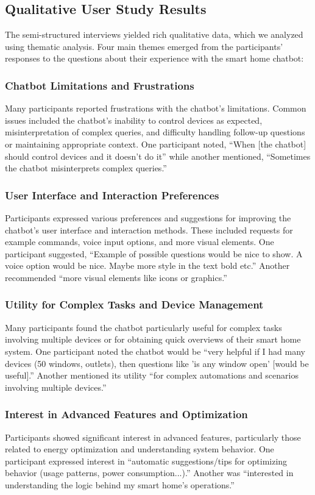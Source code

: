 \subsection{Qualitative User Study Results}
The semi-structured interviews yielded rich qualitative data, which we analyzed using thematic analysis. Four main themes emerged from the participants' responses to the questions about their experience with the smart home chatbot:
\subsubsection{Chatbot Limitations and Frustrations}
Many participants reported frustrations with the chatbot's limitations. Common issues included the chatbot's inability to control devices as expected, misinterpretation of complex queries, and difficulty handling follow-up questions or maintaining appropriate context. One participant noted, ``When [the chatbot] should control devices and it doesn't do it'' while another mentioned, ``Sometimes the chatbot misinterprets complex queries.''
\subsubsection{User Interface and Interaction Preferences}
Participants expressed various preferences and suggestions for improving the chatbot's user interface and interaction methods. These included requests for example commands, voice input options, and more visual elements. One participant suggested, ``Example of possible questions would be nice to show. A voice option would be nice. Maybe more style in the text bold etc.'' Another recommended ``more visual elements like icons or graphics.''
\subsubsection{Utility for Complex Tasks and Device Management}
Many participants found the chatbot particularly useful for complex tasks involving multiple devices or for obtaining quick overviews of their smart home system. One participant noted the chatbot would be ``very helpful if I had many devices (50 windows, outlets), then questions like 'is any window open' [would be useful].'' Another mentioned its utility ``for complex automations and scenarios involving multiple devices.''
\subsubsection{Interest in Advanced Features and Optimization}
Participants showed significant interest in advanced features, particularly those related to energy optimization and understanding system behavior. One participant expressed interest in ``automatic suggestions/tips for optimizing behavior (usage patterns, power consumption...).'' Another was ``interested in understanding the logic behind my smart home's operations.''


